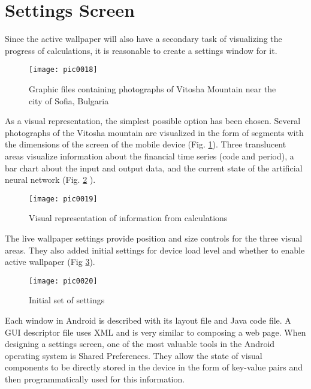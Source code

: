 \section{Settings Screen}

Since the active wallpaper will also have a secondary task of visualizing the progress of calculations, it is reasonable to create a settings window for it.

\begin{figure}[h]
\centering
\texttt{[image: pic0018]}
\caption{Graphic files containing photographs of Vitosha Mountain near the city of Sofia, Bulgaria}
\label{fig:pic0018}
\end{figure}
\FloatBarrier

As a visual representation, the simplest possible option has been chosen. Several photographs of the Vitosha mountain are visualized in the form of segments with the dimensions of the screen of the mobile device (Fig. \ref{fig:pic0018}). Three translucent areas visualize information about the financial time series (code and period), a bar chart about the input and output data, and the current state of the artificial neural network (Fig. \ref{fig:pic0019} ).

\begin{figure}[h]
\centering
\texttt{[image: pic0019]}
\caption{Visual representation of information from calculations}
\label{fig:pic0019}
\end{figure}
\FloatBarrier

The live wallpaper settings provide position and size controls for the three visual areas. They also added initial settings for device load level and whether to enable active wallpaper (Fig \ref{fig:pic0020}).

\begin{figure}[h]
\centering
\texttt{[image: pic0020]}
\caption{Initial set of settings}
\label{fig:pic0020}
\end{figure}
\FloatBarrier

Each window in Android is described with its layout file and Java code file. A GUI descriptor file uses XML and is very similar to composing a web page. When designing a settings screen, one of the most valuable tools in the Android operating system is Shared Preferences. They allow the state of visual components to be directly stored in the device in the form of key-value pairs and then programmatically used for this information.

